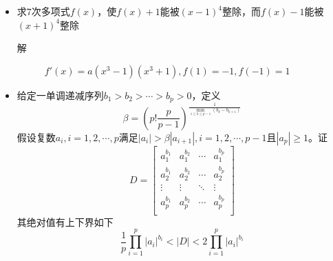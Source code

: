 \begin{itemize}
\item 求$7$次多项式$f(x)$，使$f(x)+1$能被$(x-1)^4$整除，而$f(x)-1$能被$(x+1)^4$整除
\begin{description}
\item[解] $f'(x)=a(x^3-1)(x^3+1),f(1)=-1,f(-1)=1$
\end{description}

\item 给定一单调递减序列$b_1 > b_2 > \cdots > b_p >0$，定义
\[
\beta = \left(p!\frac{p}{p-1} \right)^{\frac{1}{\min_{1\leq k\leq p-1}(b_k-b_{k+1})}}
\]
假设复数$a_i,i=1,2,\cdots,p$满足$|a_i|>\beta|a_{i+1}|,i=1,2,\cdots,p-1$且$|a_p|\geq 1$。证
\[
D=\left[
\begin{array}{cccc}
a_1^{b_1} & a_1^{b_2} & \cdots & a_1^{b_p} \\
a_2^{b_1} & a_2^{b_2} & \cdots & a_2^{b_p} \\
\vdots & \vdots & \ddots & \vdots \\
a_p^{b_1} & a_p^{b_2} & \cdots & a_p^{b_p} \\
\end{array}
\right]
\]
其绝对值有上下界如下
\[
\frac{1}{p}\prod_{i=1}^p|a_i|^{b_i}<|D|<2\prod_{i=1}^p|a_i|^{b_i}
\]


















\end{itemize}